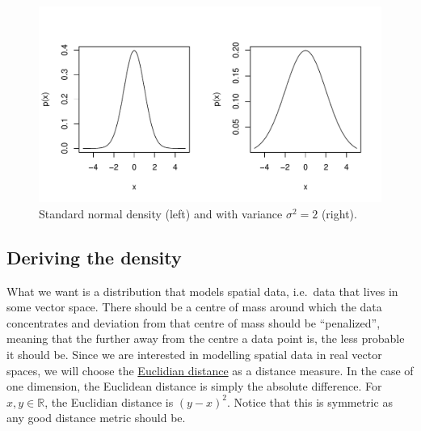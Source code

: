 \documentclass[a4paper,11pt,leqno]{report}\usepackage[]{graphicx}\usepackage[]{color}
\makeatletter
\def\maxwidth{ %
  \ifdim\Gin@nat@width>\linewidth
    \linewidth
  \else
    \Gin@nat@width
  \fi
}
\newenvironment{knitrout}{}{} %
\makeatother
\begin{document}
\begin{figure}
\center
\begin{knitrout}
\color{fgcolor}
\includegraphics[width=\maxwidth]{figures/uniGauss-1} 

\end{knitrout}
\caption{Standard normal density (left) and with variance $ \sigma^{2} = 2 $ (right).}
\label{fig:uniGauss}
\end{figure}

\subsection{Deriving the density}

What we want is a distribution that models spatial data, i.e.\ data that lives in some vector space. There should be a centre of mass around which the data concentrates
and deviation from that centre of mass should be ``penalized'', meaning that the further away from the centre a data point is, the less probable it should be.
Since we are interested in modelling spatial data in real vector spaces, we will choose the \href{https://en.wikipedia.org/wiki/Euclidean_distance}{Euclidian
distance} as a distance measure. In the case of one dimension, the Euclidean distance is simply the absolute difference. For $ x,y \in \mathbb{R} $, the Euclidian
distance is $ (y - x)^{2} $. Notice that this is symmetric as any good distance metric should be. 
\end{document}
